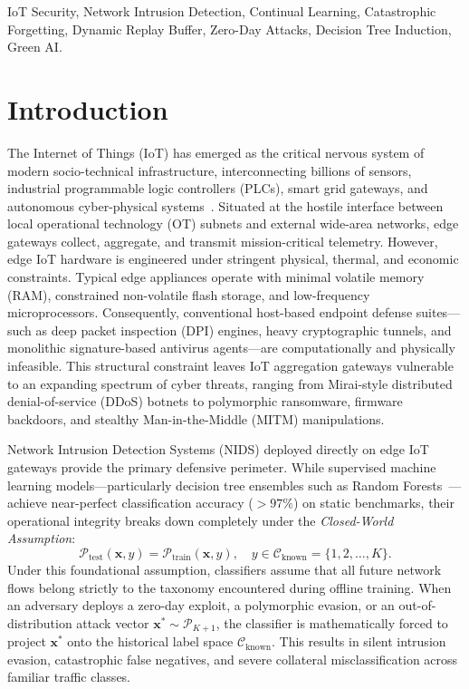 \documentclass[conference]{IEEEtran}
\begin{document}
\begin{IEEEkeywords}
IoT Security, Network Intrusion Detection, Continual Learning, Catastrophic Forgetting, Dynamic Replay Buffer, Zero-Day Attacks, Decision Tree Induction, Green AI.
\end{IEEEkeywords}

\section{Introduction}
\label{sec:introduction}

The Internet of Things (IoT) has emerged as the critical nervous system of modern socio-technical infrastructure, interconnecting billions of sensors, industrial programmable logic controllers (PLCs), smart grid gateways, and autonomous cyber-physical systems~\cite{alshammari2020toniot}. Situated at the hostile interface between local operational technology (OT) subnets and external wide-area networks, edge gateways collect, aggregate, and transmit mission-critical telemetry. However, edge IoT hardware is engineered under stringent physical, thermal, and economic constraints. Typical edge appliances operate with minimal volatile memory (RAM), constrained non-volatile flash storage, and low-frequency microprocessors. Consequently, conventional host-based endpoint defense suites—such as deep packet inspection (DPI) engines, heavy cryptographic tunnels, and monolithic signature-based antivirus agents—are computationally and physically infeasible. This structural constraint leaves IoT aggregation gateways vulnerable to an expanding spectrum of cyber threats, ranging from Mirai-style distributed denial-of-service (DDoS) botnets to polymorphic ransomware, firmware backdoors, and stealthy Man-in-the-Middle (MITM) manipulations.

Network Intrusion Detection Systems (NIDS) deployed directly on edge IoT gateways provide the primary defensive perimeter. While supervised machine learning models—particularly decision tree ensembles such as Random Forests~\cite{breiman2001random}—achieve near-perfect classification accuracy ($>97\%$) on static benchmarks, their operational integrity breaks down completely under the \emph{Closed-World Assumption}:
\begin{equation}
\mathcal{P}_{\text{test}}(\mathbf{x}, y) = \mathcal{P}_{\text{train}}(\mathbf{x}, y), \quad y \in \mathcal{C}_{\text{known}} = \{1, 2, \dots, K\}.
\end{equation}
Under this foundational assumption, classifiers assume that all future network flows belong strictly to the taxonomy encountered during offline training. When an adversary deploys a zero-day exploit, a polymorphic evasion, or an out-of-distribution attack vector $\mathbf{x}^* \sim \mathcal{P}_{K+1}$, the classifier is mathematically forced to project $\mathbf{x}^*$ onto the historical label space $\mathcal{C}_{\text{known}}$. This results in silent intrusion evasion, catastrophic false negatives, and severe collateral misclassification across familiar traffic classes.
\end{document}
